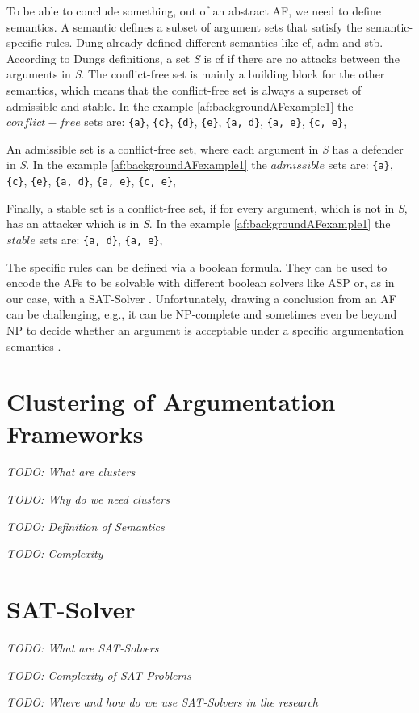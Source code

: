 To be able to conclude something, out of an abstract AF, we need to define semantics. A semantic defines a subset of argument sets that satisfy the semantic-specific rules. Dung already defined different semantics \cite{Dung1995-DUNOTA-2} like \ac{cf}, \ac{adm} and \ac{stb}. According to Dungs definitions, a set \textit{S} is \ac{cf} if there are no attacks between the arguments in \textit{S}. The conflict-free set is mainly a building block for the other semantics, which means that the conflict-free set is always a superset of admissible and stable. In the example \ref{af:backgroundAFexample1} the $conflict-free$ sets are:
\texttt{\{a\}},
\texttt{\{c\}},
\texttt{\{d\}},
\texttt{\{e\}},
\texttt{\{a, d\}},
\texttt{\{a, e\}},
\texttt{\{c, e\}},


An admissible set is a conflict-free set, where each argument in \textit{S} has a defender in \textit{S}. In the example \ref{af:backgroundAFexample1} the $admissible$ sets are:
\texttt{\{a\}},
\texttt{\{c\}},
\texttt{\{e\}},
\texttt{\{a, d\}},
\texttt{\{a, e\}},
\texttt{\{c, e\}},

Finally, a stable set is a conflict-free set, if for every argument, which is not in \textit{S}, has an attacker which is in \textit{S}. In the example \ref{af:backgroundAFexample1} the $stable$ sets are:
\texttt{\{a, d\}},
\texttt{\{a, e\}},


The specific rules can be defined via a boolean formula. They can be used to encode the \acp{AF} to be solvable with different boolean solvers like \ac{ASP} \cite{DBLP:journals/corr/abs-1301-1388} or, as in our case, with a \ac{SAT-Solver} \cite{DBLP:journals/amai/AmgoudD13}. Unfortunately, drawing a conclusion from an AF can be challenging, e.g., it can be NP-complete and sometimes even be beyond NP to decide whether an argument is acceptable under a specific argumentation semantics \cite{DBLP:journals/ai/DvorakGRW23}.



\section{Clustering of Argumentation Frameworks}

\textit{TODO: What are clusters}

\textit{TODO: Why do we need clusters}

\textit{TODO: Definition of Semantics}

\textit{TODO: Complexity}


\section{SAT-Solver}

\textit{TODO: What are SAT-Solvers}

\textit{TODO: Complexity of SAT-Problems}

\textit{TODO: Where and how do we use SAT-Solvers in the research}


